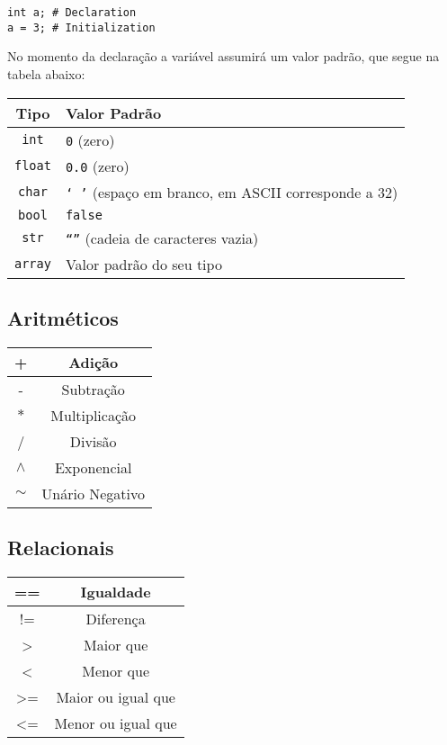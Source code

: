 \documentclass[a4paper,11pt]{article}
\begin{document}
\begin{lstlisting}
int a; # Declaration
a = 3; # Initialization
\end{lstlisting}

No momento da declaração a variável assumirá um valor padrão, que segue na tabela abaixo:
\\
\begin{center}
    \begin{tabular}{|c|l|}
         \hline
         \textbf{Tipo} & \textbf{Valor Padrão}\\
         \hline
         \texttt{int} & \texttt{0} (zero)\\
         \hline
         \texttt{float} & \texttt{0.0} (zero)\\
         \hline
         \texttt{char} & \texttt{` '} (espaço em branco, em ASCII corresponde a 32)\\
         \hline
         \texttt{bool} & \texttt{false}\\
         \hline
         \texttt{str} & \texttt{``''} (cadeia de caracteres vazia)\\
         \hline
         \texttt{array} & Valor padrão do seu tipo\\
         \hline
    \end{tabular}
\end{center}

\subsection{Aritméticos}
\begin{center}
    \begin{tabular}{|c|c|}
         \hline
         + & Adição\\
         \hline
         - & Subtração\\
         \hline
         $\ast$ & Multiplicação\\
         \hline
         / & Divisão\\
         \hline
         $\wedge$ & Exponencial\\
         \hline
         $\sim$ & Unário Negativo\\
         \hline
    \end{tabular}
\end{center}

\subsection{Relacionais}
\begin{center}
    \begin{tabular}{|c|c|}
         \hline
         == & Igualdade\\
         \hline
         != & Diferença\\
         \hline
         > & Maior que\\
         \hline
         < & Menor que\\
         \hline
         >= & Maior ou igual que\\
         \hline
         <= & Menor ou igual que\\
         \hline
    \end{tabular}
\end{center}
\end{document}
